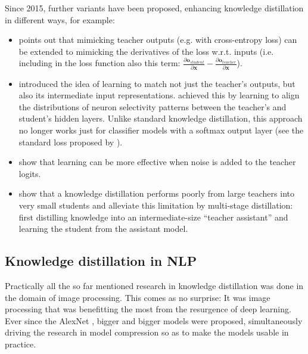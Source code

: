 \documentclass[bsc,frontabs,twoside,singlespacing,parskip,deptreport]{infthesis}
\begin{document}
{{{      Since 2015, further variants have been proposed, enhancing knowledge distillation in different ways, for example:
      \begin{itemize}
        \item \citet[p. 13]{Papamakarios_2015} points out that mimicking teacher outputs (e.g. with cross-entropy loss) can be extended to mimicking the derivatives of the loss w.r.t. inputs (i.e. including in the loss function also this term: $\frac{\partial \mathbf{o}_{student}}{\partial \mathbf{x}} - \frac{\partial \mathbf{o}_{teacher}}{\partial \mathbf{x}}$). %
        \item \citet{Romero_2015} introduced the idea of learning to match not just the teacher's outputs, but also its intermediate input representations. \citet{Huang_2017} achieved this by learning to align the distributions of neuron selectivity patterns between the teacher's and student's hidden layers. Unlike standard knowledge distillation, this approach no longer works just for classifier models with a softmax output layer (see the standard loss proposed by \citet{Hinton_2015}).
        \item \citet{Sau_2016} show that learning can be more effective when noise is added to the teacher logits.
        \item \citet{Mirzadeh_2019} show that a knowledge distillation performs poorly from large teachers into very small students and alleviate this limitation by multi-stage distillation: first distilling knowledge into an intermediate-size ``teacher assistant'' and learning the student from the assistant model.
      \end{itemize}
    }

    \subsection{Knowledge distillation in NLP}{
      Practically all the so far mentioned research in knowledge distillation was done in the domain of image processing. This comes as no surprise: It was image processing that was benefitting the most from the resurgence of deep learning. Ever since the AlexNet \citep{Krizhevsky_2012}, bigger and bigger models were proposed, simultaneously driving the research in model compression so as to make the models usable in practice.

}}}
\end{document}
